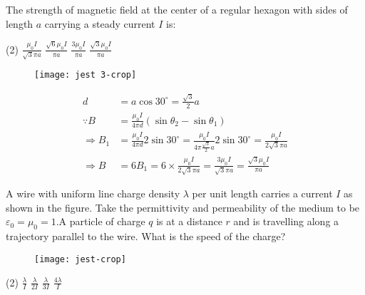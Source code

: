 \begin{enumerate}
\begin{minipage}{\textwidth}
		\item The strength of magnetic field at the center of a regular hexagon with sides of length $a$ carrying a steady current $I$ is:
	\end{minipage}
	\begin{tasks}(2)
		\task[\textbf{A.}] $\frac{\mu_{0} I}{\sqrt{3} \pi a}$ 
		\task[\textbf{B.}]$\frac{\sqrt{6} \mu_{0} I}{\pi a}$
		\task[\textbf{C.}]$\frac{3 \mu_{0} I}{\pi a}$
		\task[\textbf{D.}]$\frac{\sqrt{3} \mu_{0} I}{\pi a}$
	\end{tasks}
	\begin{answer}
		\begin{figure}[H]
			\centering
			\texttt{[image: jest 3-crop]}
		\end{figure}
		\begin{align*}
		d&=a \cos 30^{\circ}=\frac{\sqrt{3}}{2} a \\
		\because B&=\frac{\mu_{0} I}{4 \pi d}\left(\sin \theta_{2}-\sin \theta_{1}\right) \\
		\Rightarrow B_{1}&=\frac{\mu_{0} I}{4 \pi d} 2 \sin 30^{\circ}=\frac{\mu_{0} I}{4 \pi \frac{\sqrt{3}}{2} a} 2 \sin 30^{\circ}=\frac{\mu_{0} I}{2 \sqrt{3} \pi a} \\
		\Rightarrow B&=6 B_{1}=6 \times \frac{\mu_{0} I}{2 \sqrt{3} \pi a}=\frac{3 \mu_{0} I}{\sqrt{3} \pi a}=\frac{\sqrt{3} \mu_{0} I}{\pi a}
		\end{align*}
	\end{answer}
	\begin{minipage}{\textwidth}
		\item A wire with uniform line charge density $\lambda$ per unit length carries a current $I$ as shown in the figure. Take the permittivity and permeability of the medium to be $\varepsilon_{0}=\mu_{0}=1 . \mathrm{A}$ particle of charge $q$ is at a distance $r$ and is travelling along a trajectory parallel to the wire. What is the speed of the charge?
		\exyear{JEST 2019}
		\begin{figure}[H]
			\centering
			\texttt{[image: jest-crop]}
		\end{figure}
	\end{minipage}
	\begin{tasks}(2)
		\task[\textbf{A.}] $\frac{\lambda}{I}$ 
		\task[\textbf{B.}]$\frac{\lambda}{2 I}$
		\task[\textbf{C.}]$\frac{\lambda}{3 I}$
		\task[\textbf{D.}]$\frac{4 \lambda}{I}$
	\end{tasks}
	\begin{answer}
		\begin{figure}[H]

\end{figure}
\end{answer}
\end{enumerate}
